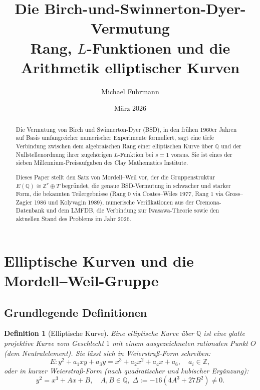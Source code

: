 \documentclass[12pt,a4paper]{article}
\title{\textbf{Die Birch-und-Swinnerton-Dyer-Vermutung}\\[0.5em]
\large Rang, $L$-Funktionen und die Arithmetik elliptischer Kurven}
\author{Michael Fuhrmann}
\date{März 2026}
\newtheorem{definition}[theorem]{Definition}
\theoremstyle{remark}
\begin{document}
\maketitle
\begin{abstract}
Die Vermutung von Birch und Swinnerton-Dyer (BSD), in den frühen 1960er Jahren auf Basis
umfangreicher numerischer Experimente formuliert, sagt eine tiefe Verbindung zwischen dem
algebraischen Rang einer elliptischen Kurve über $\mathbb{Q}$ und der Nullstellenordnung
ihrer zugehörigen $L$-Funktion bei $s=1$ voraus. Sie ist eines der sieben
Millennium-Preisaufgaben des Clay Mathematics Institute.

Dieses Paper stellt den Satz von Mordell--Weil vor, der die Gruppenstruktur
$E(\mathbb{Q}) \cong \mathbb{Z}^r \oplus T$ begründet, die genaue BSD-Vermutung in
schwacher und starker Form, die bekannten Teilergebnisse (Rang 0 via Coates--Wiles 1977,
Rang 1 via Gross--Zagier 1986 und Kolyvagin 1989), numerische Verifikationen aus der
Cremona-Datenbank und dem LMFDB, die Verbindung zur Iwasawa-Theorie sowie den aktuellen
Stand des Problems im Jahr 2026.
\end{abstract}

\tableofcontents
\newpage

\section{Elliptische Kurven und die Mordell--Weil-Gruppe}

\subsection{Grundlegende Definitionen}

\begin{definition}[Elliptische Kurve]
  Eine \emph{elliptische Kurve} über $\mathbb{Q}$ ist eine glatte projektive Kurve vom
  Geschlecht $1$ mit einem ausgezeichneten rationalen Punkt $O$ (dem Neutralelement).
  Sie lässt sich in \emph{Weierstraß-Form} schreiben:
  \begin{equation}\label{eq:weierstrass}
    E\colon y^2 + a_1 xy + a_3 y = x^3 + a_2 x^2 + a_4 x + a_6,
    \quad a_i \in \mathbb{Z},
  \end{equation}
  oder in \emph{kurzer Weierstraß-Form} (nach quadratischer und kubischer Ergänzung):
  \[
    y^2 = x^3 + Ax + B, \quad A,B\in\mathbb{Q},\; \Delta := -16(4A^3 + 27B^2) \neq 0.
  \]
\end{definition}
\end{document}
